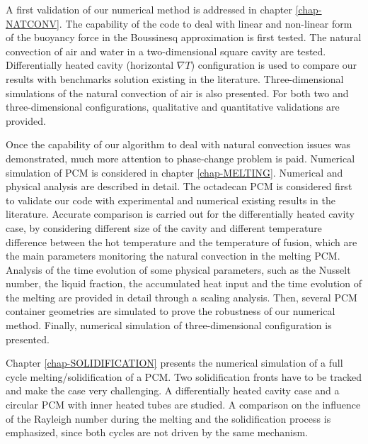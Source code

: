 A first validation of our numerical method is addressed in chapter \ref{chap-NATCONV}.
The capability of the code to deal with linear and non-linear form of the buoyancy force in the Boussinesq approximation is first tested.
The natural convection of air and water in a two-dimensional square cavity are tested.
Differentially heated cavity (horizontal $\nabla T$) configuration is used to compare our results with benchmarks solution existing in the literature.
Three-dimensional simulations of the natural convection of air is also presented.
For both two and three-dimensional configurations, qualitative and quantitative validations are provided.

Once the capability of our algorithm to deal with natural convection issues was demonstrated, much more attention to phase-change problem is paid.
Numerical simulation of PCM is considered in chapter \ref{chap-MELTING}.
Numerical and physical analysis are described in detail.
The octadecan PCM is considered first to validate our code with experimental and numerical existing results in the literature.
Accurate comparison is carried out for the differentially heated cavity case, by considering different size of the cavity and different temperature difference between the hot temperature and the temperature of fusion, which are the main parameters monitoring the natural convection in the melting PCM.
Analysis of the time evolution of some physical parameters, such as the Nusselt number, the liquid fraction, the accumulated heat input and the time evolution of the melting are provided in detail through a scaling analysis.
Then, several PCM container geometries are simulated to prove the robustness of our numerical method.
Finally, numerical simulation of three-dimensional configuration is presented.

Chapter \ref{chap-SOLIDIFICATION} presents the numerical simulation of a full cycle melting/solidification of a PCM. 
Two solidification fronts have to be tracked and make the case very challenging.
A differentially heated cavity case and a circular PCM with inner heated tubes are studied.
A comparison on the influence of the Rayleigh number during the melting and the solidification process is emphasized, since both cycles are not driven by the same mechanism.



